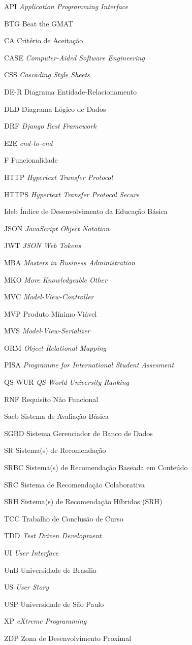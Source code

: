 \begin{siglas}
  \item[API] \textit{Application Programming Interface}
  \item[BTG] Beat the GMAT
  \item[CA] Critério de Aceitação
  \item[CASE] \textit{Computer-Aided Software Engineering}
  \item[CSS] \textit{Cascading Style Sheets}
  \item[DE-R] Diagrama Entidade-Relacionamento
  \item[DLD] Diagrama Lógico de Dados
  \item[DRF] \textit{Django Rest Framework}
  \item[E2E] \textit{end-to-end}
  \item[F] Funcionalidade
  \item[HTTP] \textit{Hypertext Transfer Protocol}
  \item[HTTPS] \textit{Hypertext Transfer Protocol Secure}
  \item[Ideb] Índice de Desenvolvimento da Educação Básica
  \item[JSON] \textit{JavaScript Object Notation}
  \item[JWT] \textit{JSON Web Tokens}
  \item[MBA] \textit{Masters in Business Administration}
  \item[MKO] \textit{More Knowledgeable Other}
  \item[MVC] \textit{Model-View-Controller}
  \item[MVP] Produto Mínimo Viável
  \item[MVS] \textit{Model-View-Serializer}
  \item[ORM] \textit{Object-Relational Mapping}
  \item[PISA] \textit{Programme for International Student Assesment}
  \item[QS-WUR] \textit{QS-World University Ranking}
  \item[RNF] Requisito Não Funcional
  \item[Saeb] Sistema de Avaliação Básica
  \item[SGBD] Sistema Gerenciador de Banco de Dados
  \item[SR] Sistema(s) de Recomendação
  \item[SRBC] Sistema(s) de Recomendação Baseada em Conteúdo
  \item[SRC] Sistema de Recomendação Colaborativa
  \item[SRH] Sistema(s) de Recomendação Híbridos (SRH) 
  \item[TCC] Trabalho de Conclusão de Curso
  \item[TDD] \textit{Test Driven Development}
  \item[UI] \textit{User Interface}
  \item[UnB] Universidade de Brasília
  \item[US] \textit{User Story}
  \item[USP] Universidade de São Paulo
  \item[XP] \textit{eXtreme Programming}
  \item[ZDP] Zona de Desenvolvimento Proximal
\end{siglas}